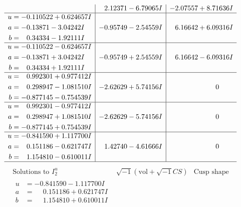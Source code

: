 \documentclass[1p]{elsarticle_modified}
\theoremstyle{definition}
\newcommand{\I}{\sqrt{-1}}
\begin{document}
$$\begin{array}{c|c|c}
 & \phantom{-}2.12371 - 6.79065 I & -2.07557 + 8.71636 I \\ \hline\begin{aligned}
u &= -0.110522 + 0.624657 I \\
a &= -0.13871 - 3.04242 I \\
b &= \phantom{-}0.34334 - 1.92111 I\end{aligned}
 & -0.95749 - 2.54559 I & \phantom{-}6.16642 + 6.09316 I \\ \hline\begin{aligned}
u &= -0.110522 - 0.624657 I \\
a &= -0.13871 + 3.04242 I \\
b &= \phantom{-}0.34334 + 1.92111 I\end{aligned}
 & -0.95749 + 2.54559 I & \phantom{-}6.16642 - 6.09316 I \\ \hline\begin{aligned}
u &= \phantom{-}0.992301 + 0.977412 I \\
a &= \phantom{-}0.298947 - 1.081510 I \\
b &= -0.877145 - 0.754539 I\end{aligned}
 & -2.62629 + 5.74156 I & \phantom{-0.000000 } 0 \\ \hline\begin{aligned}
u &= \phantom{-}0.992301 - 0.977412 I \\
a &= \phantom{-}0.298947 + 1.081510 I \\
b &= -0.877145 + 0.754539 I\end{aligned}
 & -2.62629 - 5.74156 I & \phantom{-0.000000 } 0 \\ \hline\begin{aligned}
u &= -0.841590 + 1.117700 I \\
a &= \phantom{-}0.151186 - 0.621747 I \\
b &= \phantom{-}1.154810 - 0.610011 I\end{aligned}
 & \phantom{-}1.42740 - 4.61666 I & \phantom{-0.000000 } 0\\
 \hline 
 \end{array}$$\newpage$$\begin{array}{c|c|c}  
\text{Solutions to }I^u_{2}& \I (\text{vol} + \sqrt{-1}CS) & \text{Cusp shape}\\
 \hline 
\begin{aligned}
u &= -0.841590 - 1.117700 I \\
a &= \phantom{-}0.151186 + 0.621747 I \\
b &= \phantom{-}1.154810 + 0.610011 I\end{aligned}

\end{array}$$
\end{document}
